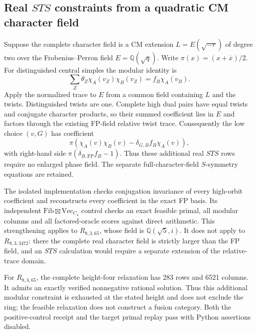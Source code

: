 \subsection{Real $STS$ constraints from a quadratic CM character field}
Suppose the complete character field is a CM extension
$L=E(\sqrt{-r})$ of degree two over the Frobenius--Perron field
$E=\mathbb Q(\sqrt q)$. Write $\pi(x)=(x+\overline{x})/2$.
For distinguished central simples the modular identity is
\[
 \sum_Z\theta_Z\chi_A(v_Z)\chi_B(v_Z)
   =f_B\chi_A(v_B).
\]
Apply the normalized trace to $E$ from a common field containing $L$
and the twists. Distinguished twists are one. Complete high dual pairs
have equal twists and conjugate character products, so their summed
coefficient lies in $E$ and factors through the existing FP-field
relative twist trace. Consequently the low choice $(v,G)$ has coefficient
\[
 \pi\!\left(\chi_A(v)\chi_B(v)
       -\delta_{G,B}f_B\chi_A(v)\right),
\]
with right-hand side $\pi(\delta_{B,\mathrm{FP}}f_B-1)$.
Thus these additional real $STS$ rows require no enlarged phase field.
The separate full-character-field $S$-symmetry equations are retained.

The isolated implementation checks conjugation invariance of every
high-orbit coefficient and reconstructs every coefficient in the exact
FP basis. Its independent
$\mathrm{Fib}\boxtimes\mathrm{Vec}_{C_4}$ control checks an exact feasible
primal, all modular columns and all factored-oracle scores against
direct arithmetic. This strengthening applies to $R_{8,3,65}$, whose
field is $\mathbb Q(\sqrt5,i)$. It does not apply to $R_{8,3,3472}$:
there the complete real character field is strictly larger than the FP
field, and an $STS$ calculation would require a separate extension of
the relative-trace domain.

For $R_{8,3,65}$, the complete height-four relaxation has 283 rows and
6521 columns. It admits an exactly verified nonnegative rational
solution. Thus this additional modular constraint is exhausted at the
stated height and does not exclude the ring; the feasible relaxation
does not construct a fusion category. Both the positive-control receipt
and the target primal replay pass with Python assertions disabled.
